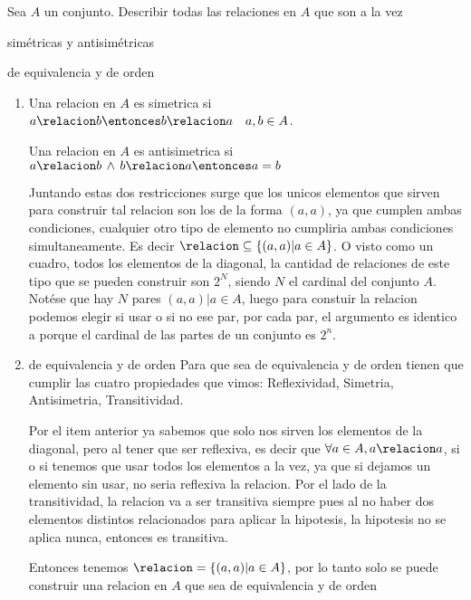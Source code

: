 \begin{enunciado}{\ejercicio}
  Sea $A$ un conjunto. Describir todas las relaciones en $A$ que son a la vez
  \begin{enumerate}[label=\roman*)]
    \begin{multicols}{2}
      \item simétricas y antisimétricas
      \item de equivalencia y de orden
    \end{multicols}
  \end{enumerate}
\end{enunciado}

\begin{enumerate}[label=\roman*)]
  \item 
  Una relacion en $A$ es simetrica si $a \relacion b \entonces b \relacion a \quad a,b \in A$.
  
  Una relacion en $A$ es antisimetrica si $a \relacion b \, \land \, b \relacion a \entonces a = b$
  
  Juntando estas dos restricciones surge que los unicos elementos que sirven para construir tal relacion son los de la forma
  $(a,a)$, ya que cumplen ambas condiciones, cualquier otro tipo de elemento no cumpliria ambas condiciones simultaneamente. 
  Es decir $\relacion \subseteq \{(a,a) | a \in A\}$. O visto como un cuadro, todos los elementos de la diagonal, la cantidad 
  de relaciones de este tipo que se pueden construir son $2^N$, siendo $N$ el cardinal del conjunto $A$. Notése que hay $N$ pares
  $(a,a) | a \in A$, luego para constuir la relacion podemos elegir si usar o si no ese par, por cada par, el argumento es identico a porque 
  el cardinal de las partes de un conjunto es $2^n$.

  \item de equivalencia y de orden
  Para que sea de equivalencia y de orden tienen que cumplir las cuatro propiedades que vimos: Reflexividad, Simetria, Antisimetria, Transitividad. 
  
  Por el item anterior ya sabemos que solo nos sirven los elementos de la diagonal, pero al tener que ser reflexiva, es decir que $\forall a \in A, a \relacion a$, 
  si o si tenemos que usar todos los elementos a la vez, ya que si dejamos un elemento sin usar, no seria reflexiva la relacion. 
  Por el lado de la transitividad, la relacion va a ser transitiva siempre pues al no haber dos elementos distintos relacionados para aplicar la hipotesis, la hipotesis no se aplica nunca, entonces es transitiva.

  Entonces tenemos $\relacion = \{(a,a) | a \in A\}$, por lo tanto solo se puede construir una relacion en $A$ que sea 
  de equivalencia y de orden

\end{enumerate}

\begin{aportes}
 \item {}
\end{aportes}

